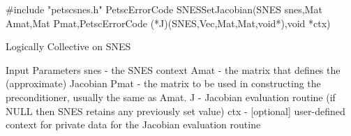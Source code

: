 #include "petscsnes.h"  
PetscErrorCode  SNESSetJacobian(SNES snes,Mat Amat,Mat Pmat,PetscErrorCode (*J)(SNES,Vec,Mat,Mat,void*),void *ctx)

Logically Collective on SNES

Input Parameters
snes - the SNES context
Amat - the matrix that defines the (approximate) Jacobian
Pmat - the matrix to be used in constructing the preconditioner, usually the same as Amat.
J    - Jacobian evaluation routine (if NULL then SNES retains any previously set value)
ctx  - [optional] user-defined context for private data for the Jacobian evaluation routine
